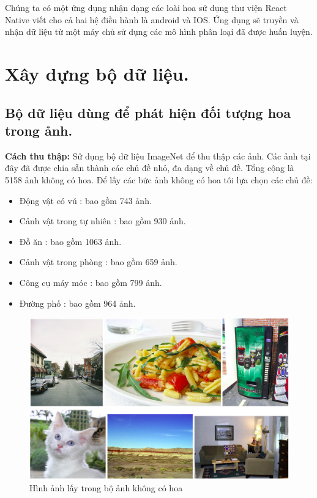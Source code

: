 \documentclass[12pt]{report}
\begin{document}
		Chúng ta có một ứng dụng nhận dạng các loài hoa sử dụng thư viện React Native viết cho cả hai hệ điều hành là android và IOS. Ứng dụng sẽ truyền và nhận dữ liệu từ một máy chủ sử dụng các mô hình phân loại đã được huấn luyện. 
										
		\section{Xây dựng bộ dữ liệu.}
		\subsection{Bộ dữ liệu dùng để phát hiện đối tượng hoa trong ảnh.}
										
		\textbf{Cách thu thập:} Sử dụng bộ dữ liệu ImageNet để thu thập các ảnh. 
		Các ảnh tại đây đã được chia sẵn thành các chủ đề nhỏ, 
		đa dạng về chủ đề. Tổng cộng là 5158 ảnh không có hoa. 
		Để lấy các bức ảnh không có hoa tôi lựa chọn các chủ đề: 
		\begin{itemize}
			\item Động vật có vú		: bao gồm 743 ảnh.
			\item Cảnh vật trong tự nhiên	: bao gồm 930 ảnh.
			\item Đồ ăn			: bao gồm 1063 ảnh.
			\item Cảnh vật trong phòng	: bao gồm 659 ảnh.
			\item Công cụ máy móc		: bao gồm 799 ảnh.
			\item Đường phố			: bao gồm 964 ảnh.
		\end{itemize}	
											
								
		\begin{figure}[h]
			\centering
			\includegraphics[scale=0.4]{nonflower}
			\caption{Hình ảnh lấy trong bộ ảnh không có hoa}
			\label{fig:nonflower}
		\end{figure}
								
\end{document}
